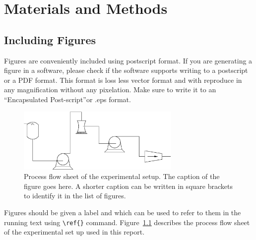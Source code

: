 
\chapter{Materials and Methods}

\section{Including Figures}

Figures are conveniently included using postscript format.  If you are
generating a figure in a software, please check if the software
supports writing to a postscript or a PDF format. This format is loss
less vector format and with reproduce in any magnification without any
pixelation. Make sure to write it to an ``Encapsulated Post-script''or
.eps format.


\begin{figure}[tbp]
  \begin{center}
    \includegraphics[width=0.7\textwidth]{profflow.eps}
    \caption[Process flow sheet]{Process flow sheet of the
      experimental setup. The caption of the figure goes here. A
      shorter caption can be written in square brackets to identify it
      in the list of figures.}
    \label{fig:pfs}
  \end{center}
\end{figure}

Figures should be given a label and which can be used to refer to them
in the running text using \verb|\ref{}| command. Figure~\ref{fig:pfs}
describes the process flow sheet of the experimental set up used in
this report.



